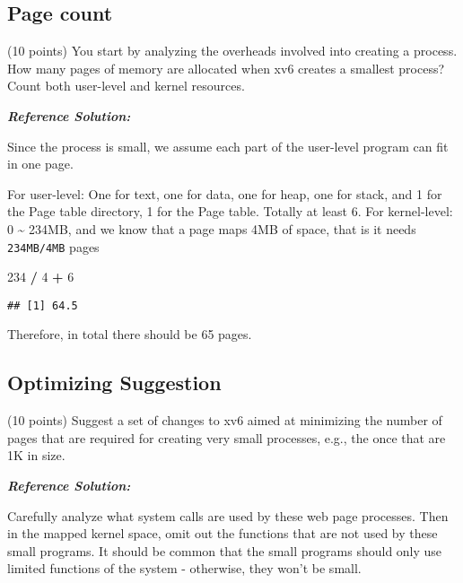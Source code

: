 \documentclass[]{article}
\newenvironment{Shaded}{\begin{snugshade}}{\end{snugshade}}
\newcommand{\DecValTok}[1]{\textcolor[rgb]{0.00,0.00,0.81}{#1}}
\newcommand{\OperatorTok}[1]{\textcolor[rgb]{0.81,0.36,0.00}{\textbf{#1}}}
\newcommand{\StringTok}[1]{\textcolor[rgb]{0.31,0.60,0.02}{#1}}
\begin{document}
\hypertarget{page-count}{%
\subsection{Page count}\label{page-count}}

(10 points) You start by analyzing the overheads involved into creating
a process. How many pages of memory are allocated when xv6 creates a
smallest process? Count both user-level and kernel resources.

\textbf{\emph{Reference Solution:}}

Since the process is small, we assume each part of the user-level
program can fit in one page.

For user-level: One for text, one for data, one for heap, one for stack,
and 1 for the Page table directory, 1 for the Page table. Totally at
least 6. For kernel-level: 0 \textasciitilde{} 234MB, and we know that a
page maps 4MB of space, that is it needs \texttt{234MB/4MB} pages

\begin{Shaded}
\begin{Highlighting}[]
\DecValTok{234} \OperatorTok{/}\StringTok{ }\DecValTok{4} \OperatorTok{+}\StringTok{ }\DecValTok{6}
\end{Highlighting}
\end{Shaded}

\begin{verbatim}
## [1] 64.5
\end{verbatim}

Therefore, in total there should be 65 pages.

\hypertarget{optimizing-suggestion}{%
\subsection{Optimizing Suggestion}\label{optimizing-suggestion}}

(10 points) Suggest a set of changes to xv6 aimed at minimizing the
number of pages that are required for creating very small processes,
e.g., the once that are 1K in size.

\textbf{\emph{Reference Solution:}}

Carefully analyze what system calls are used by these web page
processes. Then in the mapped kernel space, omit out the functions that
are not used by these small programs. It should be common that the small
programs should only use limited functions of the system - otherwise,
they won't be small.
\end{document}
